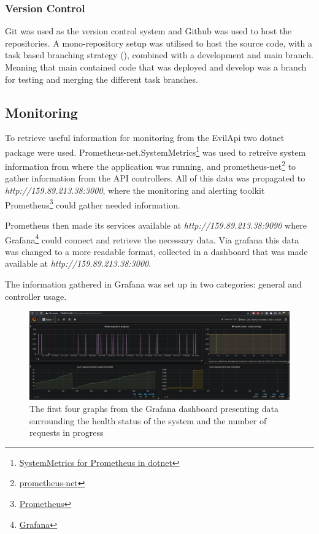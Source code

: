 \documentclass[report/main.tex]{subfiles}
\begin{document}
            \subsubsection{Version Control}
            \label{subsubsec:version-control}
                Git was used as the version control system and Github was used to host the repositories. A mono-repository setup was utilised to host the source code, with a task based branching strategy (\cite{task-branching}), combined with a development and main branch. Meaning that main contained code that was deployed and develop was a branch for testing and merging the different task branches.
                
        \subsection{Monitoring}
        \label{SubSec:monitoring}
            To retrieve useful information for monitoring from the EvilApi two dotnet package were used. Prometheus-net.SystemMetrics\footnote{\href{https://github.com/Daniel15/prometheus-net.SystemMetrics}{SystemMetrics for Prometheus in dotnet}} was used to retreive system information from where the application was running, and prometheus-net\footnote{\href{https://github.com/prometheus-net/prometheus-net}{prometheus-net}} to gather information from the API controllers. All of this data was propagated to \textit{http://159.89.213.38:3000}, where the monitoring and alerting toolkit Prometheus\footnote{\href{https://prometheus.io/}{Prometheus}} could gather needed information.
                
            Prometheus then made its services available at \textit{http://159.89.213.38:9090} where Grafana\footnote{\href{https://grafana.com/}{Grafana}} could connect and retrieve the necessary data. Via grafana this data was changed to a more readable format, collected in a dashboard that was made available at \textit{http://159.89.213.38:3000}.
            
            The information gathered in Grafana was set up in two categories: general and controller usage.
                
            \begin{figure}[H]
                \centering
                \includegraphics[width=\textwidth]{report/images/Grafana EvilTwitter 1.jpg}
                \caption{The first four graphs from the Grafana dashboard presenting data surrounding the health status of the system and the number of requests in progress}
                \label{fig:grafana_setup_1}
            \end{figure}
                
\end{document}
